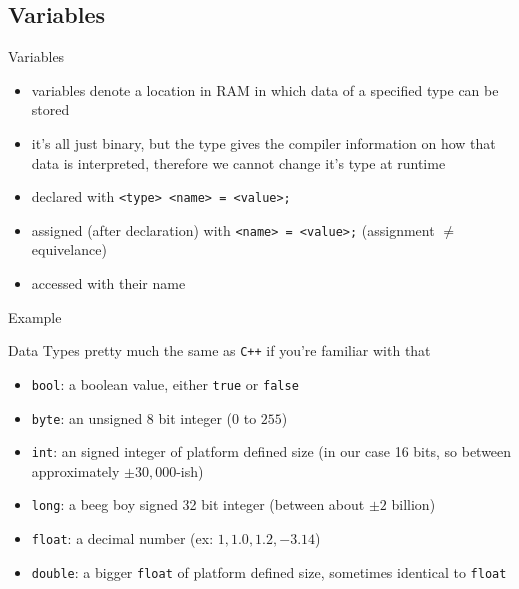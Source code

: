 \documentclass{beamer}
\newcommand{\cxx}{\texttt{C++}\xspace}
\newcommand{\examplefile}[1]{
	
}
\begin{document}
	\subsection{Variables}
	\begin{frame}[fragile]{Variables}
		\begin{itemize}
			\item variables denote a location in RAM in which data of a specified type can be stored
			\item it's all just binary, but the type gives the compiler information on how that data is interpreted, therefore we cannot change it's type at runtime
			\item declared with \verb|<type> <name> = <value>;|
			\item assigned (after declaration) with \verb|<name> = <value>;| (assignment $\neq$ equivelance)
			\item accessed with their name
		\end{itemize}
	\end{frame}

	\begin{frame}[fragile]{Example}
		\examplefile{variables.cxx}
	\end{frame}

	\begin{frame}[fragile]{Data Types}
		pretty much the same as \cxx if you're familiar with that
		\begin{itemize}
			\item \verb|bool|: a boolean value, either \verb|true| or \verb|false|
			\item \verb|byte|: an unsigned 8 bit integer ($0$ to $255$)
			\item \verb|int|: an signed integer of platform defined size (in our case 16 bits, so between approximately $\pm30,000$-ish)
			\item \verb|long|: a beeg boy signed 32 bit integer (between about $\pm2$ billion)
			\item \verb|float|: a decimal number (ex: $1, 1.0, 1.2, -3.14$)
			\item \verb|double|: a bigger \verb|float| of platform defined size, sometimes identical to \verb|float|
		\end{itemize}
	\end{frame}
\end{document}
